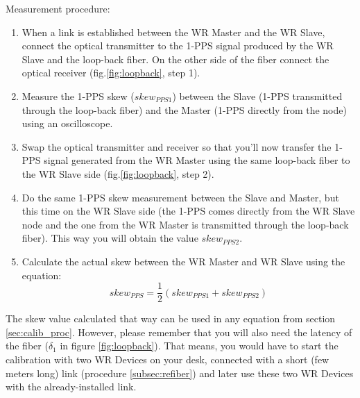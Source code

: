 Measurement procedure:
\begin{enumerate}
	\item When a link is established between the WR Master and the WR Slave,
		connect the optical transmitter to the 1-PPS signal produced by the WR Slave
		and the loop-back fiber. On the other side of the fiber connect the optical
		receiver (fig.\ref{fig:loopback}, step 1).
	\item Measure the 1-PPS skew ($skew_{PPS1}$) between the Slave (1-PPS
		transmitted through the loop-back fiber) and the Master (1-PPS directly from
		the node) using an oscilloscope.
	\item Swap the optical transmitter and receiver so that you'll now transfer
		the 1-PPS signal generated from the WR Master using the same loop-back fiber
		to the WR Slave side (fig.\ref{fig:loopback}, step 2).
	\item Do the same 1-PPS skew measurement between the Slave and Master, but
		this time on the WR Slave side (the 1-PPS comes directly from the WR Slave
		node and the one from the WR Master is transmitted through the loop-back
		fiber). This way you will obtain the value $skew_{PPS2}$.
	\item Calculate the actual skew between the WR Master and WR Slave using the
		equation:
	\begin{equation}
	skew_{PPS} = \frac{1}{2} (skew_{PPS1} + skew_{PPS2})
	\end{equation}
\end{enumerate}

The skew value calculated that way can be used in any equation from section
\ref{sec:calib_proc}. However, please remember that you will also need the
latency of the fiber ($\delta_1$ in figure \ref{fig:loopback}). That means, you
would have to start the calibration with two WR Devices on your desk, connected
with a short (few meters long) link (procedure \ref{subsec:refiber}) and later
use these two WR Devices with the already-installed link.
